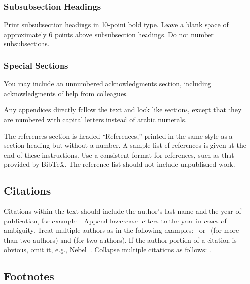 \documentclass{article}
\begin{document}
\subsubsection{Subsubsection Headings}

Print subsubsection headings in 10-point bold type. Leave a blank
space of approximately 6 points above subsubsection headings. Do not
number subsubsections.

\subsubsection{Special Sections}

You may include an unnumbered acknowledgments section, including
acknowledgments of help from colleagues.

Any appendices directly follow the text and look like sections, except
that they are numbered with capital letters instead of arabic
numerals.

The references section is headed ``References,'' printed in the same
style as a section heading but without a number. A sample list of
references is given at the end of these instructions. Use a consistent
format for references, such as that provided by Bib\TeX{}. The reference
list should not include unpublished work.

\subsection{Citations}

Citations within the text should include the author's last name and
the year of publication, for example~\cite{gottlob:nonmon}.  Append
lowercase letters to the year in cases of ambiguity.  Treat multiple
authors as in the following examples:~\cite{abelson-et-al:scheme}
or~\cite{bgf:Lixto} (for more than two authors) and
\cite{brachman-schmolze:kl-one} (for two authors).  If the author
portion of a citation is obvious, omit it, e.g.,
Nebel~.  Collapse multiple citations as
follows:~\cite{gls:hypertrees,levesque:functional-foundations}.
\nocite{abelson-et-al:scheme}
\nocite{bgf:Lixto}
\nocite{brachman-schmolze:kl-one}
\nocite{gottlob:nonmon}
\nocite{gls:hypertrees}
\nocite{levesque:functional-foundations}
\nocite{levesque:belief}
\nocite{nebel:jair-2000}

\subsection{Footnotes}
\end{document}
